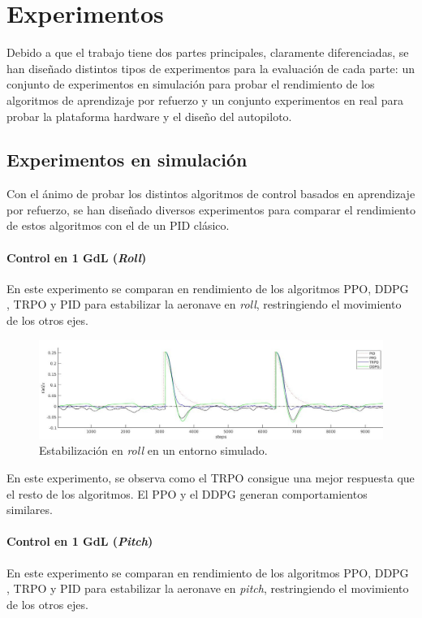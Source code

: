 \chapter{Experimentos}
Debido a que el trabajo tiene dos partes principales, claramente diferenciadas, se han diseñado distintos tipos de experimentos para la evaluación de cada parte: un conjunto de experimentos en simulación para probar el rendimiento de los algoritmos de aprendizaje por refuerzo y un conjunto experimentos en real para probar la plataforma hardware y el diseño del autopiloto.
\section{Experimentos en simulación}
Con el ánimo de probar los distintos algoritmos de control basados en aprendizaje por refuerzo, se han diseñado diversos experimentos para comparar el rendimiento de estos algoritmos con el de un PID clásico. 
\subsubsection{Control en 1 GdL (\textit{Roll})}

En este experimento se comparan en rendimiento de los algoritmos PPO, DDPG , TRPO y PID para estabilizar la aeronave en \textit{roll}, restringiendo el movimiento de los otros ejes. 

\begin{figure}[htb!]
	\centering
	\includegraphics[width=\textwidth]{experimentos/sim_onlyroll}
	\caption{Estabilización en \textit{roll} en un entorno simulado.}
	\label{mat_lab_graph}	
\end{figure}

En este experimento, se observa como el TRPO consigue una mejor respuesta que el resto de los algoritmos. El PPO y el DDPG generan comportamientos similares.
\newpage 
\subsubsection{Control en 1 GdL (\textit{Pitch})}

En este experimento se comparan en rendimiento de los algoritmos PPO, DDPG , TRPO y PID para estabilizar la aeronave en \textit{pitch}, restringiendo el movimiento de los otros ejes. 

